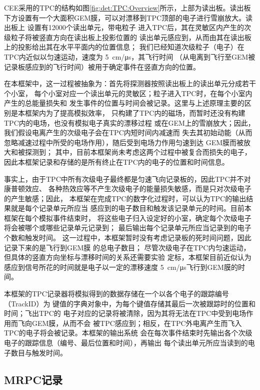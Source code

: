 \documentclass[bachelor,openany,oneside,color]{buaathesis}
\begin{document}
CEE采用的TPC的结构如图\ref{fig:det:TPC:Overview}所示，上部为读出板。读出板
下方设置有一个大面积GEM膜，可以对漂移到TPC顶部的电子进行雪崩放大。读出板上
设置有12000个读出单元\cite{Lyu:ConceptDesign}，带电粒子
进入TPC后，其在灵敏区内产生的次级粒子将被竖直方向在读出板上投影位置的
读出单元感应到，从而由其在读出板上的投影给出其在水平平面内的位置信息；
我们已经知道次级粒子（电子）在TPC内近似以匀速运动，速度为
\SI{5}{\centi\meter/\micro\second}，其飞行时间
（从电离到飞行至GEM被记录板感应到的飞行时间）被用于确定事件在竖直方向的位置。

在本框架中，这一过程被抽象为：首先将探测器按照读出板上的读出单元分成若干个小室，
每个小室对应一个读出单元的灵敏区；粒子进入TPC时，在每个小室内产生的总能量损失和
发生事件的位置与时间会被记录。这里与上述原理主要的区别是本框架内为了提高模拟效率，
只构建了TPC内的磁场，而暂时还没有构建TPC内的电场，也没有模拟电子真实的漂移过程
或在GEM上的雪崩放大；因此，我们假设电离产生的次级电子会在TPC内短时间内减速而
失去其初始动能（从而忽略减速过程中所受的电场作用），随后受到电场力作用匀速到达
GEM膜而被放大和被探测到；
其中，目前本框架尚未考虑这两个过程中被复合而损失的电子，
因此本框架记录和存储的是所有终止在TPC内的电子的位置和时间信息。

事实上，由于TPC中所有次级电子最终都是匀速飞向记录板的，因此TPC并不对康普顿效应、
各种热效应等不产生次级电子的能量损失敏感，而是只对次级电子的产生敏感；因此，
本框架在完成TPC的数字化过程时，可以认为TPC的输出结果就是每个记录单元所应当
感应到的电子数目和触发该记录单元的时间。目前本框架在每个模拟事件结束时，
将这些电子归入设定好的小室，确定每个次级电子将会被哪个或哪些记录单元记录到；
最后输出每个记录单元所应当记录到的电子个数和触发时间。
这一过程中，本框架暂时没有考虑记录板的死时间问题，因此记录下来的是飞行到GEM膜
的总电子数目；
尽管次级电子在TPC内匀速运动，但具体的竖直方向坐标与漂移时间的关系还需要实验
定标，本框架目前近似认为感应到信号所花的时间就是电子以一定的漂移速度
\SI{5}{\centi\meter/\micro\second}飞行到GEM膜的时间。

本框架的TPC记录器将模拟得到的数据存储在一个以各个电子的跟踪编号（TrackID）为
键值的字典对象中，为每个键值存储其最后一次被跟踪时的位置和时间；飞出TPC的
电子对应的记录将被清除，因为其将无法在TPC中受到电场作用而飞向GEM膜，从而不会
被TPC感应到；相反，在TPC外电离产生而飞入TPC的电子将会被记录。本框架的输出系统
会在每次事件结束时先输出各个次级电子的跟踪信息（编号、最后位置和时间），再输出
每个读出单元所应当读到的电子数目与触发时间。

\subsection{MRPC记录}\label{ssec:digi:MRPC}
\end{document}
